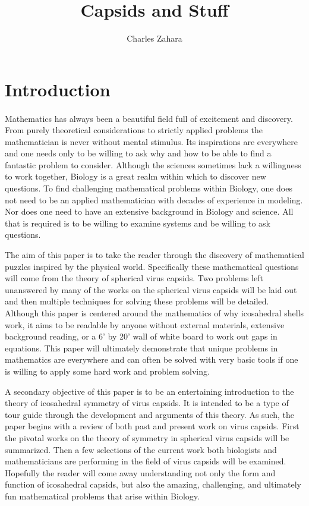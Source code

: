 \documentclass[12pt,letter]{article}
\begin{document}
\title{Capsids and Stuff}
\author{Charles Zahara}
\maketitle

\section{Introduction}


\paragraph{}
Mathematics has always been a beautiful field full of excitement and discovery. From purely theoretical considerations to strictly applied problems the mathematician is never without mental stimulus. Its inspirations are everywhere and one needs only to be willing to ask why and how to be able to find a fantastic problem to consider. Although the sciences sometimes lack a willingness to work together, Biology is a great realm within which to discover new questions. To find challenging mathematical problems within Biology, one does not need to be an applied mathematician with decades of experience in modeling. Nor does one need to have an extensive background in Biology and science. All that is required is to be willing to examine systems and be willing to ask questions.

The aim of this paper is to take the reader through the discovery of mathematical puzzles inspired by the physical world. Specifically these mathematical questions will come from the theory of spherical virus capsids. Two problems left unanswered by many of the works on the spherical virus capsids will be laid out and then multiple techniques for solving these problems will be detailed. Although this paper is centered around the mathematics of why icosahedral shells work, it aims to be readable by anyone without external materials, extensive background reading, or a 6' by 20' wall of white board to work out gaps in equations. This paper will ultimately demonstrate that unique problems in mathematics are everywhere and can often be solved with very basic tools if one is willing to apply some hard work and problem solving.

A secondary objective of this paper is to be an entertaining introduction to the theory of icosahedral symmetry of virus capsids. It is intended to be a type of tour guide through the development and arguments of this theory. As such, the paper begins with a review of both past and present work on virus capsids. First the pivotal works on the theory of symmetry in spherical virus capsids will be summarized. Then a few selections of the current work both biologists and mathematicians are performing in the field of virus capsids will be examined. Hopefully the reader will come away understanding not only the form and function of icosahedral capsids, but also the amazing, challenging, and ultimately fun mathematical problems that arise within Biology. 
\end{document}
